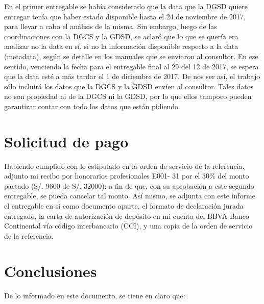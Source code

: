 \documentclass[a4paper,12pt]{texMemo}
\begin{document}
En el primer entregable se había considerado que la data que la DGSD quiere entregar tenía que haber estado disponible hasta el 24 de noviembre de 2017, para llevar a cabo el análisis de la misma. Sin embargo, luego de las coordinaciones con la DGCS y la GDSD, se aclaró que lo que se quería era analizar no la data en sí, si no la información disponible respecto a la data (metadata), según se detalle en los manuales que se enviaron al consultor. En ese sentido, venciendo la fecha para el entregable final al 29 del 12 de 2017, se espera que la data esté a más tardar el 1 de diciembre de 2017. De nos ser así, el trabajo sólo incluirá los datos que la DGCS y la GDSD envíen al consultor. Tales datos no son propiedad ni de la DGCS ni la GDSD, por lo que ellos tampoco pueden garantizar contar con todo los datos que están pidiendo.

\section{Solicitud de pago}

Habiendo cumplido con lo estipulado en la orden de servicio de la referencia, adjunto mi recibo por honorarios profesionales \textnumero E001- 31 por el 30\% del monto pactado (S/. 9600 de S/. 32000); a fin de que, con su aprobación a este segundo entregable, se pueda cancelar tal monto. Así mismo, se adjunta  con este informe el entregable en sí como documento aparte, el formato de declaración jurada entregado,  la carta de autorización de depósito en mi cuenta del BBVA Banco Continental vía código interbancario (CCI), y una copia de la orden de servicio de la referencia.

\section{Conclusiones}

De lo informado en este documento, se tiene en claro que:
\end{document}
